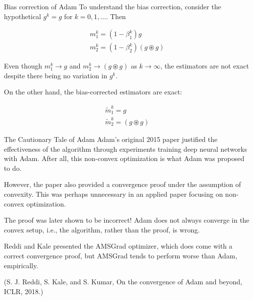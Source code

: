 \begin{frame}[allowframebreaks]

\begin{myconceptblock}{6.22}{Bias correction of Adam}
    To understand the bias correction, consider the hypothetical $g^{k}=g$ for $k=0,1, \ldots$. Then

    $$
    \begin{gathered}
    m_{1}^{k}=\left(1-\beta_{1}^{k}\right) g \\
    m_{2}^{k}=\left(1-\beta_{2}^{k}\right)(g \circledast g)
    \end{gathered}
    $$

    Even though $m_{1}^{k} \rightarrow g$ and $m_{2}^{k} \rightarrow(g \circledast g)$ as $k \rightarrow \infty$, the estimators are not exact despite there being no variation in $g^{k}$.

    On the other hand, the bias-corrected estimators are exact:

    $$
    \begin{gathered}
    \widetilde{m}_{1}^{k}=g \\
    \widetilde{m}_{2}^{k}=(g \circledast g)
    \end{gathered}
    $$
\end{myconceptblock}

\end{frame}

\begin{frame}[allowframebreaks]

\begin{myconceptblock}{6.23}{The Cautionary Tale of Adam}
    Adam's original 2015 paper justified the effectiveness of the algorithm through experiments training deep neural networks with Adam. After all, this non-convex optimization is what Adam was proposed to do.

    However, the paper also provided a convergence proof under the assumption of convexity. This was perhaps unnecessary in an applied paper focusing on non-convex optimization.

    The proof was later shown to be incorrect! Adam does not always converge in the convex setup, i.e., the algorithm, rather than the proof, is wrong.

    Reddi and Kale presented the AMSGrad optimizer, which does come with a correct convergence proof, but AMSGrad tends to perform worse than Adam, empirically.

    (S. J. Reddi, S. Kale, and S. Kumar, On the convergence of Adam and beyond, ICLR, 2018.)
\end{myconceptblock}

\end{frame}

